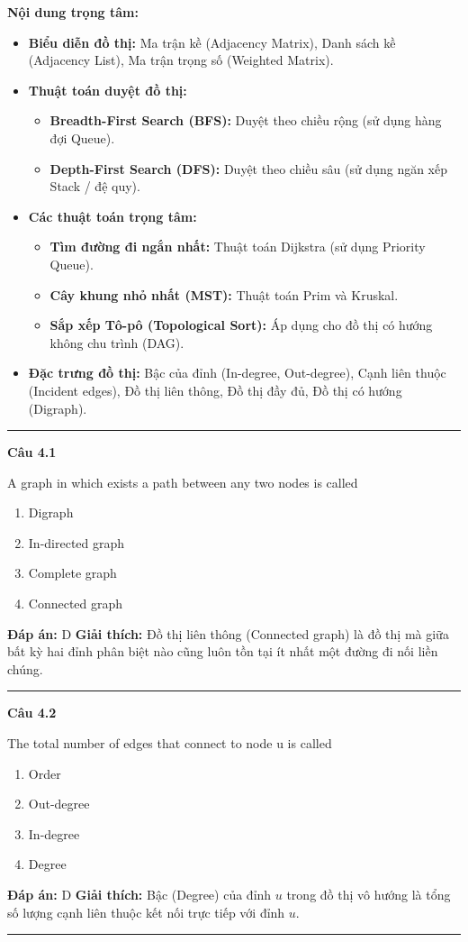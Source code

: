 \documentclass[11pt,a4paper]{article}
\newenvironment{question}[1]{%
  \par\vspace{1em}\noindent\textbf{\large Câu #1}\par\vspace{0.4em}
}{%
  \par\vspace{1em}\hrule\vspace{0.6em}
}
\newenvironment{choices}{%
  \begin{enumerate}[label=\textbf{\Alph*.},leftmargin=2.2em,itemsep=2pt,topsep=3pt]
}{%
  \end{enumerate}
}
\newcommand{\choice}{\item}
\begin{document}
\noindent\textbf{Nội dung trọng tâm:}
\begin{itemize}[noitemsep,topsep=3pt]
  \item \textbf{Biểu diễn đồ thị:} Ma trận kề (Adjacency Matrix), Danh sách kề (Adjacency List), Ma trận trọng số (Weighted Matrix).
  \item \textbf{Thuật toán duyệt đồ thị:}
    \begin{itemize}[noitemsep]
      \item \textbf{Breadth-First Search (BFS):} Duyệt theo chiều rộng (sử dụng hàng đợi Queue).
      \item \textbf{Depth-First Search (DFS):} Duyệt theo chiều sâu (sử dụng ngăn xếp Stack / đệ quy).
    \end{itemize}
  \item \textbf{Các thuật toán trọng tâm:}
    \begin{itemize}[noitemsep]
      \item \textbf{Tìm đường đi ngắn nhất:} Thuật toán Dijkstra (sử dụng Priority Queue).
      \item \textbf{Cây khung nhỏ nhất (MST):} Thuật toán Prim và Kruskal.
      \item \textbf{Sắp xếp Tô-pô (Topological Sort):} Áp dụng cho đồ thị có hướng không chu trình (DAG).
    \end{itemize}
  \item \textbf{Đặc trưng đồ thị:} Bậc của đỉnh (In-degree, Out-degree), Cạnh liên thuộc (Incident edges), Đồ thị liên thông, Đồ thị đầy đủ, Đồ thị có hướng (Digraph).
\end{itemize}
\bigskip
\hrule
\bigskip

\begin{question}{4.1}
A graph in which exists a path between any two nodes is called
\begin{choices}
\choice Digraph
\choice In-directed graph
\choice Complete graph
\choice Connected graph
\end{choices}
\textbf{Đáp án:} D
\textbf{Giải thích:} Đồ thị liên thông (Connected graph) là đồ thị mà giữa bất kỳ hai đỉnh phân biệt nào cũng luôn tồn tại ít nhất một đường đi nối liền chúng.
\end{question}

\begin{question}{4.2}
The total number of edges that connect to node u is called
\begin{choices}
\choice Order
\choice Out-degree
\choice In-degree
\choice Degree
\end{choices}
\textbf{Đáp án:} D
\textbf{Giải thích:} Bậc (Degree) của đỉnh $u$ trong đồ thị vô hướng là tổng số lượng cạnh liên thuộc kết nối trực tiếp với đỉnh $u$.
\end{question}
\end{document}
